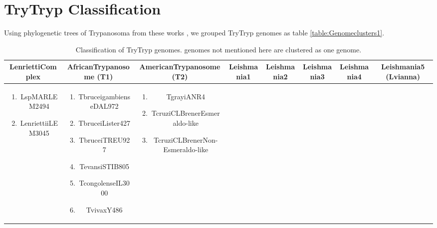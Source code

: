 \documentclass[table,
12pt, %
a4paper, %
oneside, %
headinclude,footinclude, %
BCOR5mm, %
]{scrartcl}
\begin{document}
\section{TryTryp Classification}

Using phylogenetic trees of Trypanosoma from these works \cite{Souza:2018dg,Hughes:2003,Pothirat:2014,Kelly:2017}, we grouped TryTryp genomes as table \ref{table:Genomeclusters1}.\\
\begin{table}[hbt]
  \caption{Classification of TryTryp genomes. genomes not mentioned here are clustered as one genome.}
  \begin{adjustbox}{width=\columnwidth,center}
    \begin{tabular}{|c|c|c|c|c|c|c|c|}
      \toprule LenriettiComplex                           & AfricanTrypanosome (T1)                              & AmericanTrypanosome (T2)                               & Leishmania1                                        & Leishmania2                                        & Leishmania3                                        & Leishmania4                                        & Leishmania5 (Lvianna)                              \\\midrule
      \parbox{.45\textwidth} {\begin{enumerate}
          \item LspMARLEM2494
          \item LenriettiiLEM3045
        \end{enumerate}} & \parbox{.45\textwidth}{\begin{enumerate}
          \item TbruceigambienseDAL972
          \item TbruceiLister427
          \item TbruceiTREU927
          \item TevansiSTIB805
          \item TcongolenseIL3000
          \item TvivaxY486
        \end{enumerate}} & \parbox{.45\textwidth}{\begin{enumerate}
          \item TgrayiANR4
          \item TcruziCLBrenerEsmeraldo-like
          \item TcruziCLBrenerNon-Esmeraldo-like

\end{enumerate}}
\end{tabular}
\end{adjustbox}
\end{table}
\end{document}
